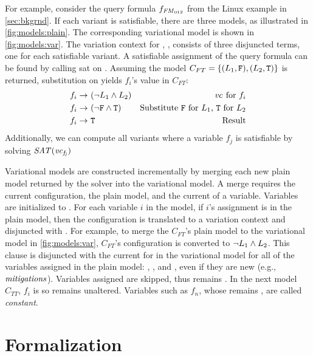 For example, consider the query formula $f_{\text{\ensuremath{\mathit{FM}_{012}}}}$ from the
Linux example in \autoref{sec:bkgrnd}.
If each variant is satisfiable, there are three models, as illustrated in
\autoref{fig:models:plain}. The corresponding variational model is shown in
\autoref{fig:models:var}.
The variation context for \SatVar{}, \Satfmf{}, consists of three
disjuncted terms, one
for each satisfiable variant. A satisfiable assignment of the query
formula can be found by calling \ac{sat} on \Satfmf{}. Assuming the model $C_{FT} =
\{(L_{1}{}, \texttt{F}{}), (L_{2}{}, \texttt{T}{})\}$ is returned, substitution on
 yields $f_{i}$'s value in $C_{FT}$:
%
\begin{align*}
  f_{i} \rightarrow\ & (\neg L_{1}{} \wedge L_{2}{}) & \text{\ensuremath{\mathit{vc}_{}} for $f_{i}$} \\
  f_{i} \rightarrow\ & (\neg \texttt{F}{} \wedge \texttt{T}{}) & \text{Substitute \texttt{F}{} for \ensuremath{L_{1}}{}, \texttt{T}{} for \ensuremath{L_{2}}{}} \\
  f_{i} \rightarrow\ & \texttt{T}{} & \text{Result}
\end{align*}%
%
Additionally, we can compute all variants where a variable $f_j$ is
satisfiable by solving $\mathit{SAT(\mathit{vc}_{f_j})}$

Variational models are constructed incrementally by merging each new plain model
returned by the solver into the variational model. A merge requires the current
configuration, the plain model, and the current \vc{} of a variable. Variables are
initialized to \fls{}. For each variable $i$ in the model, if $i$'s assignment
is \tru{} in the plain model, then the configuration is translated to a
variation context and disjuncted with . For example, to merge the
$C_{FT}$'s plain model to the variational model in \autoref{fig:models:var},
$C_{FT}$'s configuration is converted to $\neg L_{1}{} \wedge L_{2}{}$. This
clause is disjuncted with the current \vc{} for in the variational model
for all of the variables assigned \tru{} in the plain model: ,
, and , even if they are new (e.g.,
$\mathit{mitigations}$). Variables assigned \fls{} are skipped, thus  remains
\fls{}. In the next model $C_{TT}$, $f_{i}$ is \fls{} so  remains
unaltered. Variables such as $f_{n}$, whose \vc{} remains \fls{}, are called
\textit{constant}.

\section{Formalization}
% 


